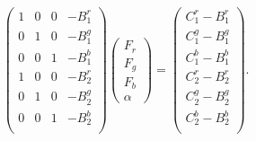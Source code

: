 \documentclass[11pt]{article}
\begin{document}

$$
\left(\begin{matrix}
1 & 	0 & 	0 & -B^{r}_1 \\
0 & 	1 & 	0 & -B^{g}_1 \\
0 & 	0 & 	1 & -B^{b}_1 \\
1 & 	0 & 	0 & -B^{r}_2 \\
0 & 	1 & 	0 & -B^{g}_2 \\
0 & 	0 & 	1 & -B^{b}_2 \\
\end{matrix} \right) 
\left(\begin{matrix}
F_r \\
F_g \\
F_b \\
\alpha
\end{matrix}\right) = 
\left(
\begin{matrix}
  C^{r}_1  -B^{r}_1 \\
  C^{g}_1 -B^{g}_1 \\
  C^{b}_1 -B^{b}_1 \\
  C^{r}_2 -B^{r}_2 \\
  C^{g}_2-B^{g}_2 \\
  C^{b}_2-B^{b}_2 \\
\end{matrix}
\right).
$$
\end{document}
